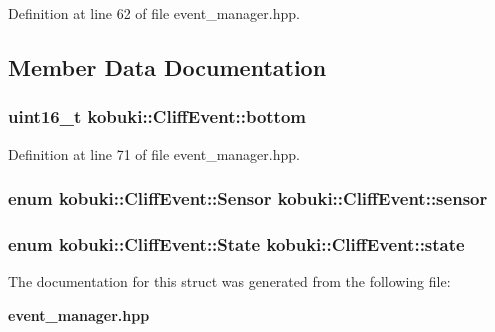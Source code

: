\-Definition at line 62 of file event\-\_\-manager.\-hpp.



\subsection{\-Member \-Data \-Documentation}
\subsubsection[{bottom}]{\setlength{\rightskip}{0pt plus 5cm}uint16\-\_\-t {\bf kobuki\-::\-Cliff\-Event\-::bottom}}\label{structkobuki_1_1CliffEvent_ae837b247e5ee75496c5d37a3dee33601}


\-Definition at line 71 of file event\-\_\-manager.\-hpp.

\subsubsection[{sensor}]{\setlength{\rightskip}{0pt plus 5cm}enum {\bf kobuki\-::\-Cliff\-Event\-::\-Sensor}  {\bf kobuki\-::\-Cliff\-Event\-::sensor}}\label{structkobuki_1_1CliffEvent_a3e3bbbcc1b8841e4b140f459e9ad2708}
\subsubsection[{state}]{\setlength{\rightskip}{0pt plus 5cm}enum {\bf kobuki\-::\-Cliff\-Event\-::\-State}  {\bf kobuki\-::\-Cliff\-Event\-::state}}\label{structkobuki_1_1CliffEvent_af702c693bc99a63e5c7f61ed17bd2497}


\-The documentation for this struct was generated from the following file\-:\begin{DoxyCompactItemize}
\item 
{\bf event\-\_\-manager.\-hpp}\end{DoxyCompactItemize}
